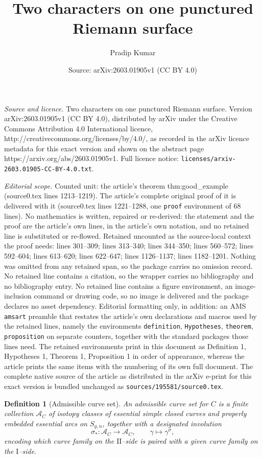 \documentclass[10pt,a4paper]{amsart}
\title{Two characters on one punctured Riemann surface}
\author{Pradip Kumar}
\date{Source: arXiv:2603.01905v1 (CC BY 4.0)}
\newtheorem{definition}{Definition}
\begin{document}
\maketitle

\noindent\emph{Source and licence.} Two characters on one punctured Riemann surface. Version arXiv:2603.01905v1 (CC BY 4.0), distributed by arXiv under the Creative Commons Attribution 4.0 International licence, http://creativecommons.org/licenses/by/4.0/, as recorded in the arXiv licence metadata for this exact version and shown on the abstract page https://arxiv.org/abs/2603.01905v1. Full licence notice: \texttt{licenses/arxiv-2603.01905-CC-BY-4.0.txt}.\par\smallskip

\noindent\textit{Editorial scope.} Counted unit: the article's theorem thm:good\_example (source0.tex lines 1213--1219). The article's complete original proof of it is delivered with it (source0.tex lines 1221--1288, one \texttt{proof} environment of 68 lines). No mathematics is written, repaired or re-derived: the statement and the proof are the article's own lines, in the article's own notation, and no retained line is substituted or re-flowed.  Retained uncounted as the source-local context the proof needs: lines 301--309; lines 313--340; lines 344--350; lines 560--572; lines 592--604; lines 613--620; lines 622--647; lines 1126--1137; lines 1182--1201.  Nothing was omitted from any retained span, so the package carries no omission record.  No retained line contains a citation, so the wrapper carries no bibliography and no bibliography entry.  No retained line contains a figure environment, an image-inclusion command or drawing code, so no image is delivered and the package declares no asset dependency.  Editorial formatting only, in addition: an AMS \texttt{amsart} preamble that restates the article's own declarations and macros used by the retained lines, namely the environments \texttt{definition}, \texttt{Hypotheses}, \texttt{theorem}, \texttt{proposition} on separate counters, together with the standard packages those lines need.  The retained environments print in this document as Definition 1, Hypotheses 1, Theorem 1, Proposition 1 in order of appearance, whereas the article prints the same items with the numbering of its own full document.  The complete native source of the article as distributed in the arXiv e-print for this exact version is bundled unchanged as \texttt{sources/195581/source0.tex}.
\begin{definition}[Admissible curve set]\label{def:AC}
An \emph{admissible curve set} for $C$ is a finite collection $\mathcal A_C$ of isotopy classes of essential
simple closed curves and properly embedded essential arcs on $S_{g,n}$,
together with a designated involution
\[
\sigma_\ast:\mathcal A_C\longrightarrow\mathcal A_C,\qquad \gamma\longmapsto \gamma^\sigma,
\]
encoding which curve family on the $\mathrm{II}$--side is paired with a given curve family on the $\mathrm{I}$--side.
\end{definition}
\end{document}
